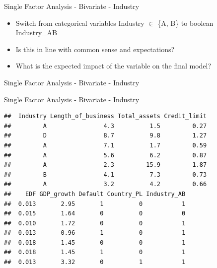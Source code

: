\documentclass[9pt,ignorenonframetext,]{beamer}
\newenvironment{Shaded}{\begin{snugshade}}{\end{snugshade}}
\newcommand{\KeywordTok}[1]{\textcolor[rgb]{0.13,0.29,0.53}{\textbf{#1}}}
\newcommand{\DataTypeTok}[1]{\textcolor[rgb]{0.13,0.29,0.53}{#1}}
\newcommand{\DecValTok}[1]{\textcolor[rgb]{0.00,0.00,0.81}{#1}}
\newcommand{\StringTok}[1]{\textcolor[rgb]{0.31,0.60,0.02}{#1}}
\newcommand{\OtherTok}[1]{\textcolor[rgb]{0.56,0.35,0.01}{#1}}
\newcommand{\OperatorTok}[1]{\textcolor[rgb]{0.81,0.36,0.00}{\textbf{#1}}}
\newcommand{\NormalTok}[1]{#1}
\providecommand{\tightlist}{%
  \setlength{\itemsep}{0pt}\setlength{\parskip}{0pt}}
\begin{document}
\begin{frame}{Single Factor Analysis - Bivariate - Industry}

\begin{itemize}
\tightlist
\item
  Switch from categorical variables Industry \(\in\) \{A, B\} to boolean
  Industry\_AB
\item
  Is this in line with common sense and expectations?
\item
  What is the expected impact of the variable on the final model?
\end{itemize}

\end{frame}

\begin{frame}[fragile]{Single Factor Analysis - Bivariate - Industry}

\begin{Shaded}
\end{Shaded}

\end{frame}

\begin{frame}[fragile]{Single Factor Analysis - Bivariate - Industry}

\begin{verbatim}
##  Industry Length_of_business Total_assets Credit_limit
##         A                4.3          1.5         0.27
##         D                8.7          9.8         1.27
##         A                7.1          1.7         0.59
##         A                5.6          6.2         0.87
##         A                2.3         15.9         1.87
##         B                4.1          7.3         0.73
##         A                3.2          4.2         0.66
##    EDF GDP_growth Default Country_PL Industry_AB
##  0.013       2.95       1          0           1
##  0.015       1.64       0          0           0
##  0.010       1.72       0          0           1
##  0.013       0.96       1          0           1
##  0.018       1.45       0          0           1
##  0.018       1.45       1          0           1
##  0.013       3.32       0          1           1
\end{verbatim}

\end{frame}
\end{document}
